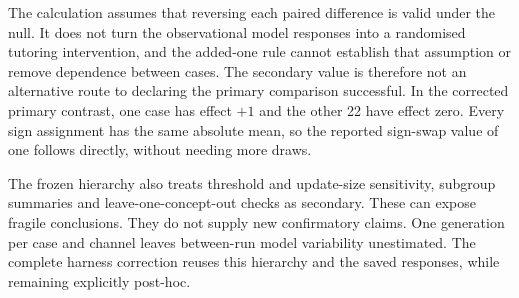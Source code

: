 The calculation assumes that reversing each paired difference is valid under the null. It does not turn the observational
model responses into a randomised tutoring intervention, and the added-one rule cannot establish that assumption or remove
dependence between cases. The secondary value is therefore not an alternative route to declaring the primary comparison
successful. In the corrected primary contrast, one case has effect $+1$ and the other 22 have effect zero. Every sign
assignment has the same absolute mean, so the reported sign-swap value of one follows directly, without needing more draws.

The frozen hierarchy also treats threshold and update-size sensitivity, subgroup summaries and leave-one-concept-out checks
as secondary. These can expose fragile conclusions. They do not supply new confirmatory claims. One generation per case and
channel leaves between-run model variability unestimated. The complete harness correction reuses this hierarchy and the
saved responses, while remaining explicitly post-hoc.
